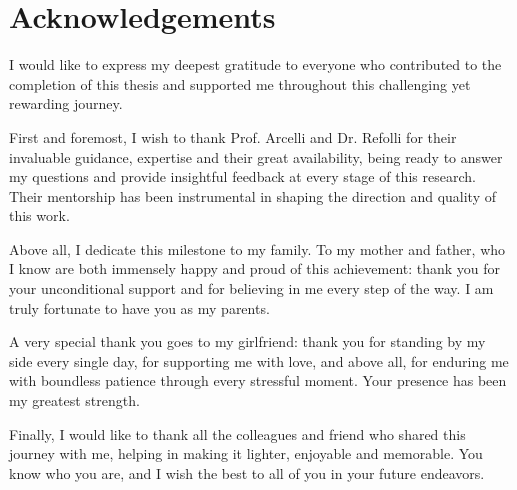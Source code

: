 \frontmatter
\chapter{Acknowledgements}
I would like to express my deepest gratitude to everyone who
contributed to the completion of this thesis and supported me
throughout this challenging yet rewarding journey.

First and foremost, I wish to thank Prof. Arcelli and Dr. Refolli for their
invaluable guidance, expertise and their great availability, being ready to
answer my questions and provide insightful feedback at every stage of
this research. Their mentorship has been instrumental in shaping the
direction and quality of this work.

Above all, I dedicate this milestone to my family. To my mother and father,
who I know are both immensely happy and proud of this achievement: thank you
for your unconditional support and for believing in me every step of the way.
I am truly fortunate to have you as my parents.

A very special thank you goes to my girlfriend: thank you for
standing by my side every single day, for supporting me with love,
and above all, for enduring me with boundless patience through every
stressful moment. Your presence has been my greatest strength.

Finally, I would like to thank all the colleagues and friend who
shared this journey with me, helping in making it lighter, enjoyable
and memorable. You know who you are, and I wish the best to all of
you in your future endeavors.


\mainmatter

